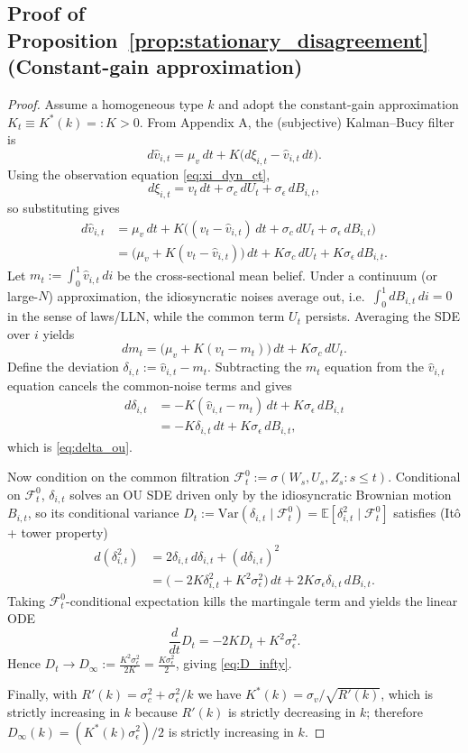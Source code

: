 \subsection*{Proof of Proposition~\ref{prop:stationary_disagreement} (Constant-gain approximation)}
\begin{proof}
Assume a homogeneous type $k$ and adopt the constant-gain approximation $K_t\equiv K^*(k)=:K>0$.
From Appendix A, the (subjective) Kalman--Bucy filter is
\[
d\hat v_{i,t}=\mu_v\,dt+K\big(d\xi_{i,t}-\hat v_{i,t}\,dt\big).
\]
Using the observation equation \eqref{eq:xi_dyn_ct},
\[
d\xi_{i,t}=v_t\,dt+\sigma_c\,dU_t+\sigma_\epsilon\,dB_{i,t},
\]
so substituting gives
\[
\begin{aligned}
d\hat v_{i,t}
&=\mu_v\,dt+K\big((v_t-\hat v_{i,t})\,dt+\sigma_c\,dU_t+\sigma_\epsilon\,dB_{i,t}\big)\\
&= \big(\mu_v+K(v_t-\hat v_{i,t})\big)\,dt+K\sigma_c\,dU_t+K\sigma_\epsilon\,dB_{i,t}.
\end{aligned}
\]
Let $m_t:=\int_0^1 \hat v_{i,t}\,di$ be the cross-sectional mean belief. Under a continuum (or large-$N$) approximation,
the idiosyncratic noises average out, i.e.\ $\int_0^1 dB_{i,t}\,di=0$ in the sense of laws/LLN, while the common term
$U_t$ persists. Averaging the SDE over $i$ yields
\[
dm_t=\big(\mu_v+K(v_t-m_t)\big)\,dt+K\sigma_c\,dU_t.
\]
Define the deviation $\delta_{i,t}:=\hat v_{i,t}-m_t$. Subtracting the $m_t$ equation from the $\hat v_{i,t}$ equation cancels
the common-noise terms and gives
\[
\begin{aligned}
d\delta_{i,t}
&= -K(\hat v_{i,t}-m_t)\,dt + K\sigma_\epsilon\,dB_{i,t}\\
&= -K\delta_{i,t}\,dt+K\sigma_\epsilon\,dB_{i,t},
\end{aligned}
\]
which is \eqref{eq:delta_ou}.

Now condition on the common filtration $\mathcal F_t^0:=\sigma(W_s,U_s,Z_s:s\le t)$. Conditional on $\mathcal F_t^0$,
$\delta_{i,t}$ solves an OU SDE driven only by the idiosyncratic Brownian motion $B_{i,t}$, so its conditional variance
$D_t:=\mathrm{Var}(\delta_{i,t}\mid \mathcal F_t^0)=\mathbb E[\delta_{i,t}^2\mid \mathcal F_t^0]$ satisfies (It\^o + tower property)
\[
\begin{aligned}
d(\delta_{i,t}^2)
&=2\delta_{i,t}\,d\delta_{i,t}+(d\delta_{i,t})^2\\
&=\big(-2K\delta_{i,t}^2+K^2\sigma_\epsilon^2\big)\,dt+2K\sigma_\epsilon\delta_{i,t}\,dB_{i,t}.
\end{aligned}
\]
Taking $\mathcal F_t^0$-conditional expectation kills the martingale term and yields the linear ODE
\[
\frac{d}{dt}D_t = -2K D_t + K^2\sigma_\epsilon^2.
\]
Hence $D_t\to D_\infty:=\frac{K^2\sigma_\epsilon^2}{2K}=\frac{K\sigma_\epsilon^2}{2}$, giving \eqref{eq:D_infty}.

Finally, with $R'(k)=\sigma_c^2+\sigma_\epsilon^2/k$ we have $K^*(k)=\sigma_v/\sqrt{R'(k)}$, which is strictly increasing in $k$
because $R'(k)$ is strictly decreasing in $k$; therefore $D_\infty(k)=(K^*(k)\sigma_\epsilon^2)/2$ is strictly increasing in $k$.
\end{proof}

